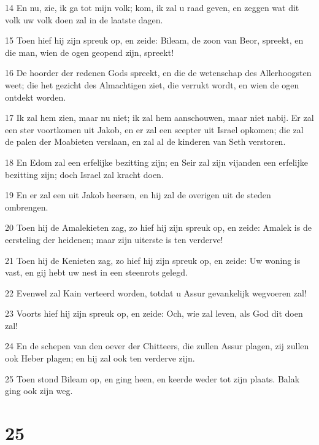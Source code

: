 \par 14 En nu, zie, ik ga tot mijn volk; kom, ik zal u raad geven, en zeggen wat dit volk uw volk doen zal in de laatste dagen.
\par 15 Toen hief hij zijn spreuk op, en zeide: Bileam, de zoon van Beor, spreekt, en die man, wien de ogen geopend zijn, spreekt!
\par 16 De hoorder der redenen Gods spreekt, en die de wetenschap des Allerhoogsten weet; die het gezicht des Almachtigen ziet, die verrukt wordt, en wien de ogen ontdekt worden.
\par 17 Ik zal hem zien, maar nu niet; ik zal hem aanschouwen, maar niet nabij. Er zal een ster voortkomen uit Jakob, en er zal een scepter uit Israel opkomen; die zal de palen der Moabieten verslaan, en zal al de kinderen van Seth verstoren.
\par 18 En Edom zal een erfelijke bezitting zijn; en Seir zal zijn vijanden een erfelijke bezitting zijn; doch Israel zal kracht doen.
\par 19 En er zal een uit Jakob heersen, en hij zal de overigen uit de steden ombrengen.
\par 20 Toen hij de Amalekieten zag, zo hief hij zijn spreuk op, en zeide: Amalek is de eersteling der heidenen; maar zijn uiterste is ten verderve!
\par 21 Toen hij de Kenieten zag, zo hief hij zijn spreuk op, en zeide: Uw woning is vast, en gij hebt uw nest in een steenrots gelegd.
\par 22 Evenwel zal Kain verteerd worden, totdat u Assur gevankelijk wegvoeren zal!
\par 23 Voorts hief hij zijn spreuk op, en zeide: Och, wie zal leven, als God dit doen zal!
\par 24 En de schepen van den oever der Chitteers, die zullen Assur plagen, zij zullen ook Heber plagen; en hij zal ook ten verderve zijn.
\par 25 Toen stond Bileam op, en ging heen, en keerde weder tot zijn plaats. Balak ging ook zijn weg.

\chapter{25}

